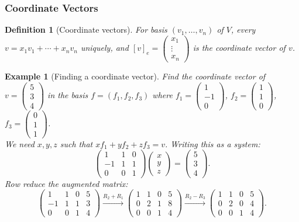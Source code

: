\documentclass{article}
\newtheorem{definition}{Definition}
\newtheorem*{example}{Example}
\begin{document}
\subsubsection{Coordinate Vectors}
\begin{definition}[Coordinate vectors]
    For basis $(v_1,\ldots,v_n)$ of $V$, every $v=x_1v_1+\cdots+x_nv_n$ uniquely, and $[v]_e = \begin{pmatrix}x_1\\\vdots\\x_n\end{pmatrix}$ is the coordinate vector of $v$.
\end{definition}
\begin{example}[Finding a coordinate vector]
    Find the coordinate vector of $v=\begin{pmatrix}5\\3\\4\end{pmatrix}$ in the basis $f=\left(f_1,f_2,f_3\right)$ where $f_1=\begin{pmatrix}1\\-1\\0\end{pmatrix}$, $f_2=\begin{pmatrix}1\\1\\0\end{pmatrix}$, $f_3=\begin{pmatrix}0\\1\\1\end{pmatrix}$.\\
    We need $x,y,z$ such that $xf_1+yf_2+zf_3=v$. Writing this as a system:
    \[\begin{pmatrix}1&1&0\\-1&1&1\\0&0&1\end{pmatrix}\begin{pmatrix}x\\y\\z\end{pmatrix}=\begin{pmatrix}5\\3\\4\end{pmatrix}.\]
    Row reduce the augmented matrix:
    \[\begin{pmatrix}1&1&0&5\\-1&1&1&3\\0&0&1&4\end{pmatrix}\xrightarrow{R_2+R_1}\begin{pmatrix}1&1&0&5\\0&2&1&8\\0&0&1&4\end{pmatrix}\xrightarrow{R_2-R_3}\begin{pmatrix}1&1&0&5\\0&2&0&4\\0&0&1&4\end{pmatrix}.\]

\end{example}
\end{document}
